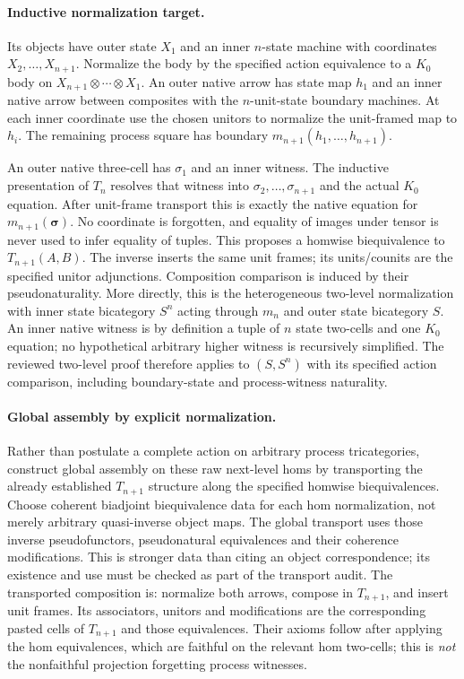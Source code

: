 \documentclass{article}
\begin{document}
\paragraph{Inductive normalization target.} Its objects have outer state $X_1$ and an inner $n$-state machine with coordinates $X_2,\ldots,X_{n+1}$. Normalize the body by the specified action equivalence to a $K_0$ body on $X_{n+1}\otimes\cdots\otimes X_1$. An outer native arrow has state map $h_1$ and an inner native arrow between composites with the $n$-unit-state boundary machines. At each inner coordinate use the chosen unitors to normalize the unit-framed map to $h_i$. The remaining process square has boundary $m_{n+1}(h_1,\ldots,h_{n+1})$.

An outer native three-cell has $\sigma_1$ and an inner witness. The inductive presentation of $T_n$ resolves that witness into $\sigma_2,\ldots,\sigma_{n+1}$ and the actual $K_0$ equation. After unit-frame transport this is exactly the native equation for $m_{n+1}(\boldsymbol\sigma)$. No coordinate is forgotten, and equality of images under tensor is never used to infer equality of tuples. This proposes a homwise biequivalence to $T_{n+1}(A,B)$. The inverse inserts the same unit frames; its units/counits are the specified unitor adjunctions. Composition comparison is induced by their pseudonaturality. More directly, this is the heterogeneous two-level normalization with inner state bicategory $S^n$ acting through $m_n$ and outer state bicategory $S$. An inner native witness is by definition a tuple of $n$ state two-cells and one $K_0$ equation; no hypothetical arbitrary higher witness is recursively simplified. The reviewed two-level proof therefore applies to $(S,S^n)$ with its specified action comparison, including boundary-state and process-witness naturality.

\paragraph{Global assembly by explicit normalization.} Rather than postulate a complete action on arbitrary process tricategories, construct global assembly on these raw next-level homs by transporting the already established $T_{n+1}$ structure along the specified homwise biequivalences. Choose coherent biadjoint biequivalence data for each hom normalization, not merely arbitrary quasi-inverse object maps. The global transport uses those inverse pseudofunctors, pseudonatural equivalences and their coherence modifications. This is stronger data than citing an object correspondence; its existence and use must be checked as part of the transport audit. The transported composition is: normalize both arrows, compose in $T_{n+1}$, and insert unit frames. Its associators, unitors and modifications are the corresponding pasted cells of $T_{n+1}$ and those equivalences. Their axioms follow after applying the hom equivalences, which are faithful on the relevant hom two-cells; this is \emph{not} the nonfaithful projection forgetting process witnesses.
\end{document}
